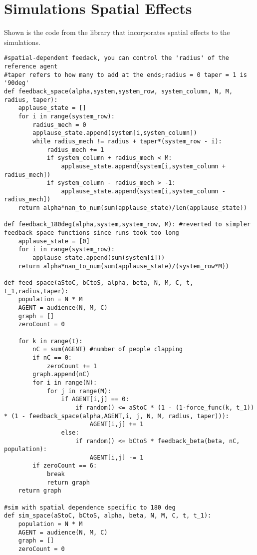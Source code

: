 \chapter{Simulations Spatial Effects}
\label{apndx:spacesim}

Shown is the code from the library that incorporates spatial effects to the simulations.

\begin{lstlisting}
#spatial-dependent feedack, you can control the 'radius' of the reference agent
#taper refers to how many to add at the ends;radius = 0 taper = 1 is '90deg'    
def feedback_space(alpha,system,system_row, system_column, N, M, radius, taper):
    applause_state = []
    for i in range(system_row):
        radius_mech = 0
        applause_state.append(system[i,system_column])
        while radius_mech != radius + taper*(system_row - i):
            radius_mech += 1
            if system_column + radius_mech < M:
                applause_state.append(system[i,system_column + radius_mech])
            if system_column - radius_mech > -1:
                applause_state.append(system[i,system_column - radius_mech])
    return alpha*nan_to_num(sum(applause_state)/len(applause_state))
    
def feedback_180deg(alpha,system,system_row, M): #reverted to simpler feedback space functions since runs took too long
    applause_state = [0]
    for i in range(system_row):
        applause_state.append(sum(system[i]))
    return alpha*nan_to_num(sum(applause_state)/(system_row*M))
    
def feed_space(aStoC, bCtoS, alpha, beta, N, M, C, t, t_1,radius,taper):
    population = N * M
    AGENT = audience(N, M, C)
    graph = []
    zeroCount = 0

    for k in range(t):
        nC = sum(AGENT) #number of people clapping
        if nC == 0:
            zeroCount += 1
        graph.append(nC)
        for i in range(N):
            for j in range(M):
                if AGENT[i,j] == 0:
                    if random() <= aStoC * (1 - (1-force_func(k, t_1)) * (1 - feedback_space(alpha,AGENT,i, j, N, M, radius, taper))):
                        AGENT[i,j] += 1
                else:
                    if random() <= bCtoS * feedback_beta(beta, nC, population):
                        AGENT[i,j] -= 1
        if zeroCount == 6:
            break
            return graph
    return graph

#sim with spatial dependence specific to 180 deg
def sim_space(aStoC, bCtoS, alpha, beta, N, M, C, t, t_1):
    population = N * M
    AGENT = audience(N, M, C)
    graph = []
    zeroCount = 0


\end{lstlisting}
